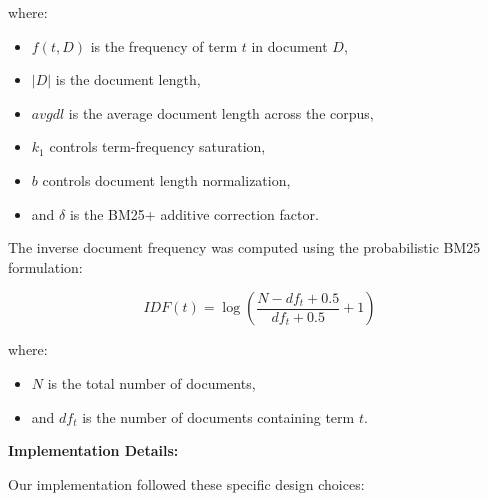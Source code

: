 \documentclass{article}
\begin{document}
where:
\begin{itemize}
    \item \(f(t,D)\) is the frequency of term \(t\) in document \(D\),
    \item \(|D|\) is the document length,
    \item \(avgdl\) is the average document length across the corpus,
    \item \(k_1\) controls term-frequency saturation,
    \item \(b\) controls document length normalization,
    \item and \(\delta\) is the BM25+ additive correction factor.
\end{itemize}

The inverse document frequency was computed using the probabilistic BM25 formulation:

\[
IDF(t)=\log\left(
\frac{N-df_t+0.5}{df_t+0.5}+1
\right)
\]

where:
\begin{itemize}
    \item \(N\) is the total number of documents,
    \item and \(df_t\) is the number of documents containing term \(t\).
\end{itemize}

\textbf{Implementation Details:}

Our implementation followed these specific design choices:
\end{document}
